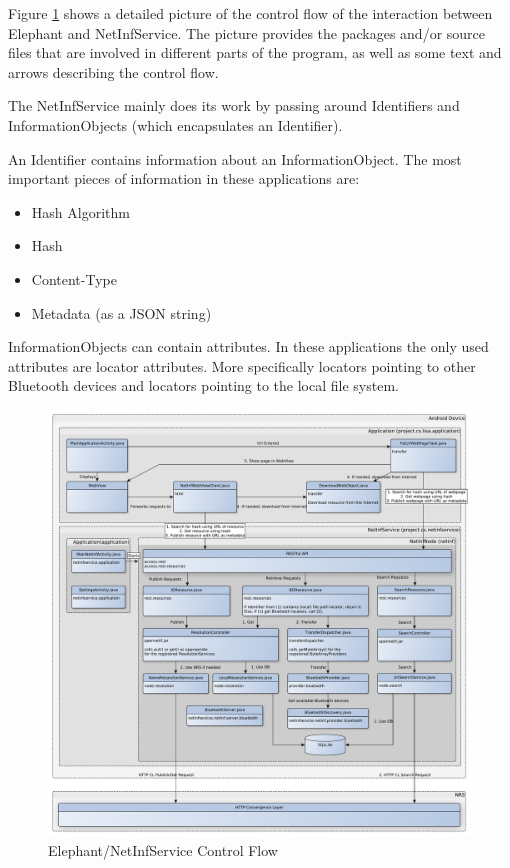 Figure \ref{fig:controlflow} shows a detailed picture of the control flow of the interaction between Elephant and NetInfService. The picture provides the packages and/or source files that are involved in different parts of the program, as well as some text and arrows describing the control flow.

The NetInfService mainly does its work by passing around Identifiers and InformationObjects (which encapsulates an Identifier).

An Identifier contains information about an InformationObject. The most important pieces of information in these applications are:
\begin{itemize}
\item Hash Algorithm
\item Hash
\item Content-Type
\item Metadata (as a JSON string)
\end{itemize}

InformationObjects can contain attributes. In these applications the only used attributes are locator attributes. More specifically locators pointing to other Bluetooth devices and locators pointing to the local file system.

\begin{figure}[h!]
	\centering
		\includegraphics[width=1\textwidth]{./img/flowchart}
    	\caption{Elephant/NetInfService Control Flow}
	\label{fig:controlflow}
\end{figure}

